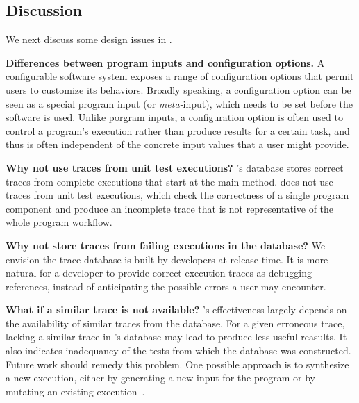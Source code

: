 \subsection{Discussion}

We next discuss some design issues in \ourtool.

\vspace{1mm}
\noindent \textbf{Differences between program inputs and configuration options.}
A configurable software system exposes a range of configuration
options that permit users to
customize its behaviors. Broadly speaking,
a configuration option can be seen as a special program input
(or \textit{meta-}input), which needs to be set before the
software is used. Unlike porgram inputs, a configuration option is often
used to control a program's execution rather than
produce results for a certain task, and thus
is often independent of the concrete input values that a user might provide.


\vspace{1mm}
\noindent \textbf{Why not use traces from unit test executions?}
\ourtool's database stores correct traces from complete 
executions that start at the main method.
\ourtool does not use traces from unit test executions, which check the
correctness
of a single program component and produce
an incomplete trace that is not representative of
the whole program workflow. 



\vspace{1mm}
\noindent \textbf{Why not store traces from failing executions in the database?}
We envision the trace database is built by developers at release time.
It is more natural for a developer to provide correct execution
traces as debugging references, instead of
anticipating the possible errors a user may encounter.


\vspace{1mm}
\noindent \textbf{What if a similar trace is not available?}
\ourtool's effectiveness largely depends on the availability of
similar traces from the database. For a given erroneous trace, lacking a similar
trace in \ourtool's database may lead \ourtool to produce
less useful reasults.  It also indicates inadequancy of the tests from
which the database was constructed.
Future work should remedy this problem. One
possible approach is to synthesize a new execution, either by
generating a new input for the program or by mutating an
existing execution~\cite{sumnerICSE2011}.


